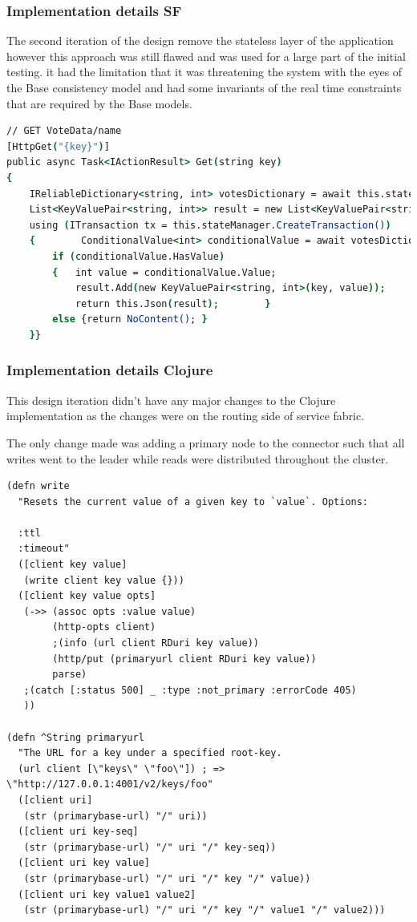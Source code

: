 \documentclass[a4paper,10pt,titlepage]{report}
\begin{document}
    \subsubsection{Implementation details SF}
    The second iteration of the design remove the stateless layer of the application however this approach was still flawed and was used for a large part of the initial testing. it had the limitation that it was threatening the system with the eyes of the Base consistency model and had some invariants of the real time constraints that are required by the Base models.
\begin{lstlisting}[language=csh]
// GET VoteData/name
[HttpGet("{key}")]
public async Task<IActionResult> Get(string key)
{
    IReliableDictionary<string, int> votesDictionary = await this.stateManager.GetOrAddAsync<IReliableDictionary<string, int>>("counts");
    List<KeyValuePair<string, int>> result = new List<KeyValuePair<string, int>>();
    using (ITransaction tx = this.stateManager.CreateTransaction())
    {        ConditionalValue<int> conditionalValue = await votesDictionary.TryGetValueAsync(tx, key);
        if (conditionalValue.HasValue)
        {   int value = conditionalValue.Value;
            result.Add(new KeyValuePair<string, int>(key, value));
            return this.Json(result);        }
        else {return NoContent(); }
    }}
\end{lstlisting}  


    \subsubsection{Implementation details Clojure}
    
    This design iteration didn't have any major changes to the Clojure implementation as the changes were on the routing side of service fabric.
    
    The only change made was adding a primary node to the connector such that all writes went to the leader while reads were distributed throughout the cluster. 
    \begin{lstlisting}
(defn write
  "Resets the current value of a given key to `value`. Options:

  :ttl
  :timeout"
  ([client key value]
   (write client key value {}))
  ([client key value opts]
   (->> (assoc opts :value value)
        (http-opts client)
        ;(info (url client RDuri key value))
        (http/put (primaryurl client RDuri key value))
        parse)
   ;(catch [:status 500] _ :type :not_primary :errorCode 405)
   ))
 
(defn ^String primaryurl
  "The URL for a key under a specified root-key.
  (url client [\"keys\" \"foo\"]) ; => \"http://127.0.0.1:4001/v2/keys/foo"
  ([client uri]
   (str (primarybase-url) "/" uri))
  ([client uri key-seq]
   (str (primarybase-url) "/" uri "/" key-seq))
  ([client uri key value]
   (str (primarybase-url) "/" uri "/" key "/" value))
  ([client uri key value1 value2]
   (str (primarybase-url) "/" uri "/" key "/" value1 "/" value2)))
\end{lstlisting}  
\end{document}
